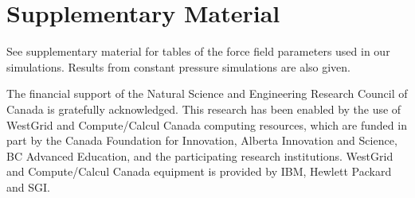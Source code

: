 \documentclass[preprint,aps,prb,floatfix]{revtex4-1}
\begin{document}
\section*{Supplementary Material}
See supplementary material for tables of the force field parameters used in our simulations. Results from constant pressure simulations are also given. 

\begin{acknowledgments}
The financial support of the Natural Science and Engineering Research Council of Canada is gratefully acknowledged. This research has been enabled by the use of WestGrid and Compute/Calcul Canada computing resources, which are funded in part by the Canada Foundation for Innovation, Alberta Innovation and Science, BC Advanced Education, and the participating research institutions. WestGrid and Compute/Calcul Canada equipment is provided by IBM, Hewlett Packard and SGI.
\end{acknowledgments}

\clearpage
\end{document}
